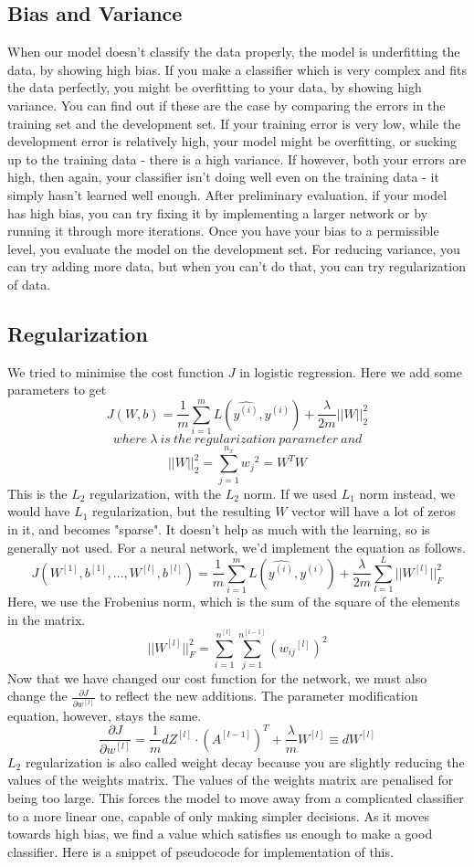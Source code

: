 \documentclass{article}
\begin{document}
\subsection{Bias and Variance}

When our model doesn't classify the data properly, the model is underfitting the data, by showing high bias. If you make a classifier which is very complex and fits the data perfectly, you might be overfitting to your data, by showing high variance. You can find out if these are the case by comparing the errors in the training set and the development set. If your training error is very low, while the development error is relatively high, your model might be overfitting, or sucking up to the training data - there is a high variance. If however, both your errors are high, then again, your classifier isn't doing well even on the training data - it simply hasn't learned well enough. After preliminary evaluation, if your model has high bias, you can try fixing it by implementing a larger network or by running it through more iterations. Once you have your bias to a permissible level, you evaluate the model on the development set. For reducing variance, you can try adding more data, but when you can't do that, you can try regularization of data.

\subsection{Regularization}

We tried to minimise the cost function $J$ in logistic regression. Here we add some parameters to get
$$J(W, b) = \frac{1}{m} \sum_{i=1}^{m} L(\hat{y^{(i)}}, y^{(i)}) + \frac{\lambda}{2m} ||W||_2^2$$
$$where\ \lambda\ is\ the\ regularization\ parameter\ and$$
$$||W||_2^2 = \sum_{j=1}^{n_x} {w_j}^2 = W^T W$$
This is the $L_2$ regularization, with the $L_2$ norm. If we used $L_1$ norm instead, we would have $L_1$ regularization, but the resulting $W$ vector will have a lot of zeros in it, and becomes "sparse". It doesn't help as much with the learning, so is generally not used. For a neural network, we'd implement the equation as follows.
$$J(W^{[1]}, b^{[1]}, ..., W^{[l]}, b^{[l]}) = \frac{1}{m} \sum_{i=1}^{m} L(\hat{y^{(i)}}, y^{(i)}) + \frac{\lambda}{2m} \sum_{l=1}^L ||W^{[l]}||_F^2$$
Here, we use the Frobenius norm, which is the sum of the square of the elements in the matrix.
$$||W^{[l]}||_F^2 = \sum_{i=1}^{n^{[l]}} \sum_{j=1}^{n^{[l-1]}} ({w_{ij}}^{[l]})^2$$
Now that we have changed our cost function for the network, we must also change the $\frac{\partial J}{\partial w^{[l]}}$ to reflect the new additions. The parameter modification equation, however, stays the same.
$$\frac{\partial J}{\partial w^{[l]}} = \frac{1}{m} dZ^{[l]} \cdot (A^{[l-1]})^T + \frac{\lambda}{m} W^{[l]} \equiv dW^{[l]}$$
$L_2$ regularization is also called weight decay because you are slightly reducing the values of the weights matrix. The values of the weights matrix are penalised for being too large. This forces the model to move away from a complicated classifier to a more linear one, capable of only making simpler decisions. As it moves towards high bias, we find a value which satisfies us enough to make a good classifier. Here is a snippet of pseudocode for implementation of this.
\end{document}
